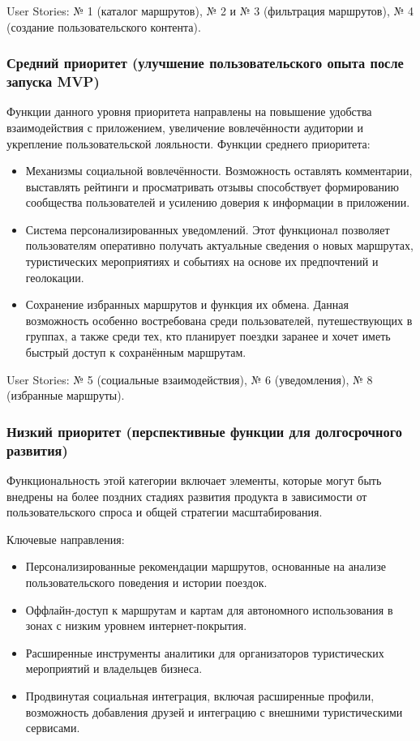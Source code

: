 User Stories: № 1 (каталог маршрутов), № 2 и № 3 (фильтрация маршрутов), № 4 (создание пользовательского контента).

\subsubsection*{Средний приоритет (улучшение пользовательского опыта после запуска MVP)}
Функции данного уровня приоритета направлены на повышение удобства взаимодействия с приложением, увеличение вовлечённости аудитории и укрепление пользовательской лояльности.
Функции среднего приоритета:
\begin{itemize}
    \item 	Механизмы социальной вовлечённости. Возможность оставлять комментарии, выставлять рейтинги и просматривать отзывы способствует формированию сообщества пользователей и усилению доверия к информации в приложении.
    \item 	Система персонализированных уведомлений. Этот функционал позволяет пользователям оперативно получать актуальные сведения о новых маршрутах, туристических мероприятиях и событиях на основе их предпочтений и геолокации.
    \item 	Сохранение избранных маршрутов и функция их обмена. Данная возможность особенно востребована среди пользователей, путешествующих в группах, а также среди тех, кто планирует поездки заранее и хочет иметь быстрый доступ к сохранённым маршрутам.
\end{itemize}

User Stories: № 5 (социальные взаимодействия), № 6 (уведомления), № 8 (избранные маршруты).

\subsubsection*{Низкий приоритет (перспективные функции для долгосрочного развития)}
Функциональность этой категории включает элементы, которые могут быть внедрены на более поздних стадиях развития продукта в зависимости от пользовательского спроса и общей стратегии масштабирования.

Ключевые направления:
\begin{itemize}
    \item 	Персонализированные рекомендации маршрутов, основанные на анализе пользовательского поведения и истории поездок.
    \item 	Оффлайн-доступ к маршрутам и картам для автономного использования в зонах с низким уровнем интернет-покрытия.
    \item 	Расширенные инструменты аналитики для организаторов туристических мероприятий и владельцев бизнеса.
    \item 	Продвинутая социальная интеграция, включая расширенные профили, возможность добавления друзей и интеграцию с внешними туристическими сервисами.
\end{itemize}

